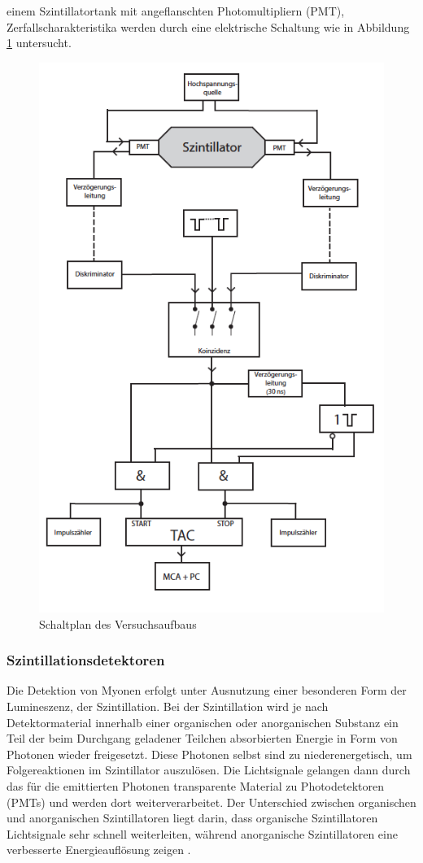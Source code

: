 einem Szintillatortank mit angeflanschten Photomultipliern (PMT),
Zerfallscharakteristika werden durch eine elektrische Schaltung wie in Abbildung
\ref{fig:02} untersucht. \\
\FloatBarrier
  \begin{figure}
    \centering
    \includegraphics[scale=0.7]{resources/schaltplan.png}
    \caption{Schaltplan des Versuchsaufbaus}
    \label{fig:02}
  \end{figure}
  \FloatBarrier
\subsubsection{Szintillationsdetektoren}
\noindent Die Detektion von Myonen erfolgt unter Ausnutzung einer besonderen
Form der Lumineszenz, der Szintillation. Bei der Szintillation wird je nach
Detektormaterial innerhalb einer organischen oder anorganischen Substanz ein
Teil der beim Durchgang geladener Teilchen absorbierten Energie in Form von
Photonen wieder freigesetzt. Diese Photonen selbst sind zu niederenergetisch, um
Folgereaktionen im Szintillator auszulösen. Die Lichtsignale gelangen dann durch
das für die emittierten Photonen transparente Material zu Photodetektoren (PMTs) und
werden dort weiterverarbeitet. Der Unterschied zwischen organischen und
anorganischen Szintillatoren liegt darin, dass organische Szintillatoren
Lichtsignale sehr schnell weiterleiten, während anorganische Szintillatoren
eine verbesserte Energieauflösung zeigen \cite{szintillatoren}.
